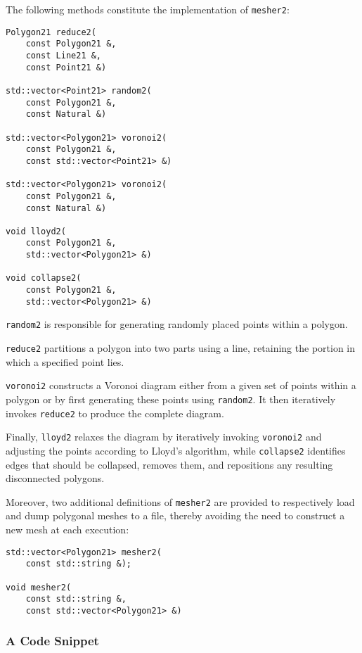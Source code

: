 The following methods constitute the implementation of \lstinline{mesher2}:

\begin{lstlisting}[style=cpp]
Polygon21 reduce2(
    const Polygon21 &, 
    const Line21 &, 
    const Point21 &)

std::vector<Point21> random2(
    const Polygon21 &, 
    const Natural &)

std::vector<Polygon21> voronoi2(
    const Polygon21 &, 
    const std::vector<Point21> &)

std::vector<Polygon21> voronoi2(
    const Polygon21 &, 
    const Natural &)

void lloyd2(
    const Polygon21 &, 
    std::vector<Polygon21> &)

void collapse2(
    const Polygon21 &, 
    std::vector<Polygon21> &)
\end{lstlisting}

\lstinline{random2} is responsible for generating randomly placed points within a polygon.

\lstinline{reduce2} partitions a polygon into two parts using a line, retaining the portion in which a specified point lies.

\lstinline{voronoi2} constructs a Voronoi diagram either from a given set of points within a polygon or by first generating these points using \lstinline{random2}. It then iteratively invokes \lstinline{reduce2} to produce the complete diagram.

Finally, \lstinline{lloyd2} relaxes the diagram by iteratively invoking \lstinline{voronoi2} and adjusting the points according to Lloyd's algorithm, while \lstinline{collapse2} identifies edges that should be collapsed, removes them, and repositions any resulting disconnected polygons.

\newpage
Moreover, two additional definitions of \lstinline{mesher2} are provided to respectively load and dump polygonal meshes to a file, thereby avoiding the need to construct a new mesh at each execution:
\begin{lstlisting}[style=cpp]
std::vector<Polygon21> mesher2(
    const std::string &);

void mesher2(
    const std::string &, 
    const std::vector<Polygon21> &)
\end{lstlisting}

\subsubsection{A Code Snippet}

